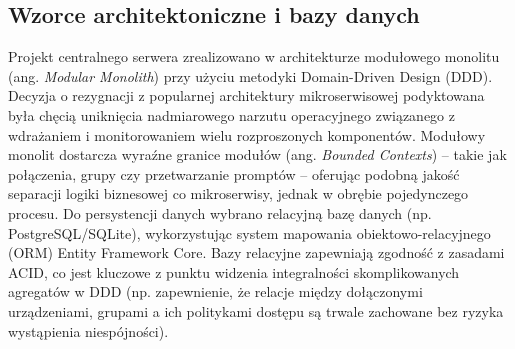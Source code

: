 \subsection{Wzorce architektoniczne i bazy danych}
\label{sec:technologie_bazodanowe}
Projekt centralnego serwera zrealizowano w architekturze modułowego monolitu (ang. \textit{Modular Monolith}) przy użyciu metodyki Domain-Driven Design (DDD). Decyzja o rezygnacji z popularnej architektury mikroserwisowej podyktowana była chęcią uniknięcia nadmiarowego narzutu operacyjnego związanego z wdrażaniem i monitorowaniem wielu rozproszonych komponentów. Modułowy monolit dostarcza wyraźne granice modułów (ang. \textit{Bounded Contexts}) – takie jak połączenia, grupy czy przetwarzanie promptów – oferując podobną jakość separacji logiki biznesowej co mikroserwisy, jednak w obrębie pojedynczego procesu. Do persystencji danych wybrano relacyjną bazę danych (np. PostgreSQL/SQLite), wykorzystując system mapowania obiektowo-relacyjnego (ORM) Entity Framework Core. Bazy relacyjne zapewniają zgodność z zasadami ACID, co jest kluczowe z punktu widzenia integralności skomplikowanych agregatów w DDD (np. zapewnienie, że relacje między dołączonymi urządzeniami, grupami a ich politykami dostępu są trwale zachowane bez ryzyka wystąpienia niespójności).
